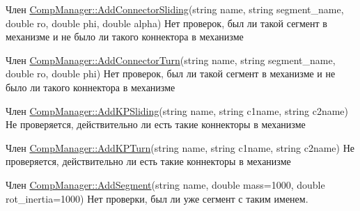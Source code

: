 \label{bug__bug000010}
\hypertarget{bug__bug000010}{}
 
\begin{DoxyDescription}
\item[Член \hyperlink{class_comp_manager_a1cf12ded84bf7d17ebbd4c042971133a}{CompManager::AddConnectorSliding}(string name, string segment\_\-name, double ro, double phi, double alpha) ]Нет проверок, был ли такой сегмент в механизме и не было ли такого коннектора в механизме 
\end{DoxyDescription}

\label{bug__bug000009}
\hypertarget{bug__bug000009}{}
 
\begin{DoxyDescription}
\item[Член \hyperlink{class_comp_manager_a11f96f8ae164686d883b92605e3601d5}{CompManager::AddConnectorTurn}(string name, string segment\_\-name, double ro, double phi) ]Нет проверок, был ли такой сегмент в механизме и не было ли такого коннектора в механизме 
\end{DoxyDescription}

\label{bug__bug000006}
\hypertarget{bug__bug000006}{}
 
\begin{DoxyDescription}
\item[Член \hyperlink{class_comp_manager_a4686577f86845ea8df4f3b2682782fac}{CompManager::AddKPSliding}(string name, string c1name, string c2name) ]Не проверяется, действительно ли есть такие коннекторы в механизме 
\end{DoxyDescription}

\label{bug__bug000005}
\hypertarget{bug__bug000005}{}
 
\begin{DoxyDescription}
\item[Член \hyperlink{class_comp_manager_ad772ce1d11dc2e636f02cf9b56cf90fb}{CompManager::AddKPTurn}(string name, string c1name, string c2name) ]Не проверяется, действительно ли есть такие коннекторы в механизме 
\end{DoxyDescription}

\label{bug__bug000002}
\hypertarget{bug__bug000002}{}
 
\begin{DoxyDescription}
\item[Член \hyperlink{class_comp_manager_a7ecbf9a15c3fc964ab7d6ab4024f25ac}{CompManager::AddSegment}(string name, double mass=1000, double rot\_\-inertia=1000) ]Нет проверки, был ли уже сегмент с таким именем. 
\end{DoxyDescription}

